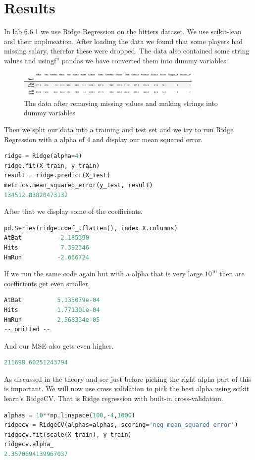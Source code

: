 \section{Results}
In lab 6.6.1 we use Ridge Regression on the hitters dataset. We use scikit-lean and their implmeation. After loading the data we found that some players had missing salary, therefor these were dropped. The data also contained some string values and usingf'' pandas we have converted them into dummy variables.  
\begin{figure}[H]
	\centering
	\includegraphics[width=0.8\textwidth]{shrinkageMethods/fig/data.png}
	\caption{The data after removing missing values and making strings into dummy variables }
	\label{fig:normfirstsecond}
\end{figure}
Then we split our data into a training and test set and we try to run Ridge Regression with a alpha of 4 and display our mean squared error.
\begin{lstlisting}[language=Python]
ridge = Ridge(alpha=4)
ridge.fit(X_train, y_train)
result = ridge.predict(X_test)
metrics.mean_squared_error(y_test, result)
134512.83820473132
\end{lstlisting}
After that we display some of the coefficients.
\begin{lstlisting}[language=Python]
pd.Series(ridge.coef_.flatten(), index=X.columns)
AtBat          -2.185390
Hits            7.392346
HmRun          -2.666724
\end{lstlisting}
If we run the same code again but with a alpha that is very large $10^10$ then are coefficients get even smaller.
\begin{lstlisting}[language=Python]
AtBat          5.135079e-04
Hits           1.771301e-04
HmRun          2.568334e-05
-- omitted --
\end{lstlisting}
And our MSE also gets even higher.
\begin{lstlisting}[language=Python]
211698.60251243794
\end{lstlisting}
As discussed in the theory and see just before picking the right alpha part of this is important. We will now use cross validation to pick the best alpha using scikit learn's RidgeCV. That is Ridge regression with built-in cross-validation.
\begin{lstlisting}[language=Python]
alphas = 10**np.linspace(100,-4,1000)
ridgecv = RidgeCV(alphas=alphas, scoring='neg_mean_squared_error')
ridgecv.fit(scale(X_train), y_train)
ridgecv.alpha_
2.3570694139967037
\end{lstlisting}
